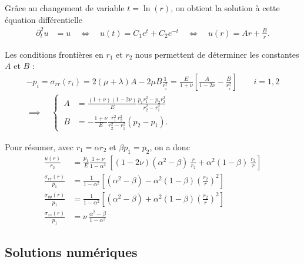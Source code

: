 \documentclass[12pt]{article}
\begin{document}
Grâce au changement de variable $t = \ln(r)$, on obtient la solution à cette 
équation différentielle
\begin{align}
    \partial_t^2 u &= u \quad\iff\quad
    u(t) = C_1 e^{t} + C_2 e^{-t} \quad\iff\quad
    u(r) = A r + \frac{B}{r}.
\end{align}

Les conditions frontières en $r_1$ et $r_2$ nous permettent de déterminer les
constantes $A$ et $B$ :
\begin{gather}
    -p_i = \sigma_{rr}(r_i) 
    = 2(\mu + \lambda) A - 2\mu B \frac{1}{r_i^2}
    = \frac{E}{1+\nu} \left[
        \frac{A}{1-2\nu} - \frac{B}{r_i^2}
    \right]
    \qquad i=1,2\\
    \implies \quad \left\{\:
    \begin{aligned}
        A &= \frac{(1+\nu)(1-2\nu)}{E} \frac{p_1 r_1^2 - p_2 r_2^2}{r_2^2 - r_1^2}\\
        B &= -\frac{1+\nu}{E} \frac{r_1^2\: r_2^2}{r_2^2-r_1^2} (p_2 - p_1) .
    \end{aligned}\right.
\end{gather}

Pour résumer, avec $r_1 = \alpha r_2$ et $\beta p_1 = p_2$, on a donc
\begin{align}
    \frac{u(r)}{r_2} &= 
    \frac{p_1}{E} \frac{1+\nu}{1 - \alpha^2} \: \left[
        (1-2\nu) (\alpha^2 - \beta) \: \frac{r}{r_2}
        + \alpha^2 (1 - \beta) \:\frac{r_2}{r}
    \right]\\
    \frac{\sigma_{rr}(r)}{p_1} &= 
    \frac{1}{1-\alpha^2} \left[
        (\alpha^2 -\beta) - 
        \alpha^2 (1 - \beta) \left(\frac{r_2}{r}\right)^2
    \right]\\
    \frac{\sigma_{\theta\theta}(r)}{p_1} &= 
        \frac{1}{1-\alpha^2} \left[
            (\alpha^2 -\beta) + 
            \alpha^2 (1 - \beta) \left(\frac{r_2}{r}\right)^2
        \right]\\
    \frac{\sigma_{zz}(r)}{p_1} &=
        \nu \:\frac{\alpha^2 -\beta}{1-\alpha^2} 
\end{align}

\subsection{Solutions numériques}
\end{document}
